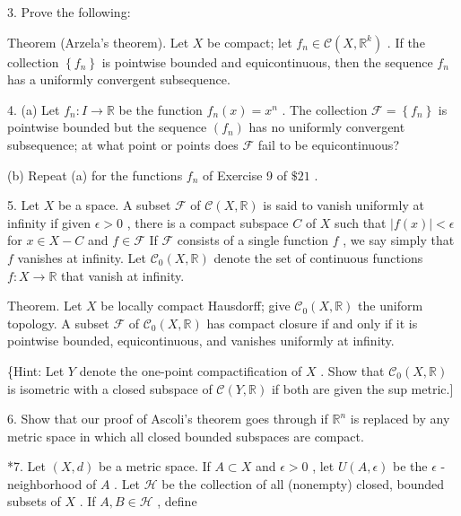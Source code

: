 \documentclass[10pt]{article}
\begin{document}
3. Prove the following:

Theorem (Arzela’s theorem). Let \(X\) be compact; let \({f}_{n} \in  \mathcal{C}\left( {X,{\mathbb{R}}^{k}}\right)\) . If the collection \(\left\{  {f}_{n}\right\}\) is pointwise bounded and equicontinuous, then the sequence \({f}_{n}\) has a uniformly convergent subsequence.

4. (a) Let \({f}_{n} : I \rightarrow  \mathbb{R}\) be the function \({f}_{n}\left( x\right)  = {x}^{n}\) . The collection \(\mathcal{F} = \left\{  {f}_{n}\right\}\) is pointwise bounded but the sequence \(\left( {f}_{n}\right)\) has no uniformly convergent subsequence; at what point or points does \(\mathcal{F}\) fail to be equicontinuous?

(b) Repeat (a) for the functions \({f}_{n}\) of Exercise 9 of \(\$ {21}\) .

5. Let \(X\) be a space. A subset \(\mathcal{F}\) of \(\mathcal{C}\left( {X,\mathbb{R}}\right)\) is said to vanish uniformly at infinity if given \(\epsilon  > 0\) , there is a compact subspace \(C\) of \(X\) such that \(\left| {f\left( x\right) }\right|  < \epsilon\) for \(x \in  X - C\) and \(f \in  \mathcal{F}\) If \(\mathcal{F}\) consists of a single function \(f\) , we say simply that \(f\) vanishes at infinity. Let \({\mathcal{C}}_{0}\left( {X,\mathbb{R}}\right)\) denote the set of continuous functions \(f : X \rightarrow  \mathbb{R}\) that vanish at infinity.

Theorem. Let \(X\) be locally compact Hausdorff; give \({\mathcal{C}}_{0}\left( {X,\mathbb{R}}\right)\) the uniform topology. A subset \(\mathcal{F}\) of \({\mathcal{C}}_{0}\left( {X,\mathbb{R}}\right)\) has compact closure if and only if it is pointwise bounded, equicontinuous, and vanishes uniformly at infinity.

\{Hint: Let \(Y\) denote the one-point compactification of \(X\) . Show that \({\mathcal{C}}_{0}\left( {X,\mathbb{R}}\right)\) is isometric with a closed subspace of \(\mathcal{C}\left( {Y,\mathbb{R}}\right)\) if both are given the sup metric.]

6. Show that our proof of Ascoli’s theorem goes through if \({\mathbb{R}}^{n}\) is replaced by any metric space in which all closed bounded subspaces are compact.

*7. Let \(\left( {X,d}\right)\) be a metric space. If \(A \subset  X\) and \(\epsilon  > 0\) , let \(U\left( {A,\epsilon }\right)\) be the \(\epsilon\) - neighborhood of \(A\) . Let \(\mathcal{H}\) be the collection of all (nonempty) closed, bounded subsets of \(X\) . If \(A,B \in  \mathcal{H}\) , define
\end{document}
